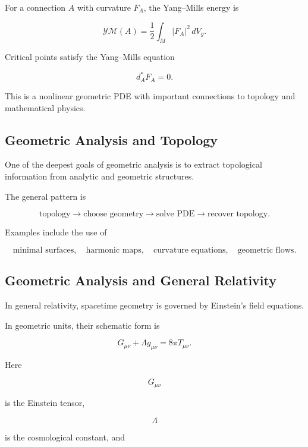 For a connection \(A\) with curvature \(F_A\), the Yang--Mills energy is

\[
\boxed{
\mathcal{YM}(A)
=
\frac12
\int_M
|F_A|^2
\,dV_g.
}
\]

Critical points satisfy the Yang--Mills equation

\[
\boxed{
d_A^\ast F_A=0.
}
\]

This is a nonlinear geometric PDE with important connections to topology
and mathematical physics.

\subsection{Geometric Analysis and Topology}
\label{subsec:geometric-analysis-topology}

One of the deepest goals of geometric analysis is to extract topological
information from analytic and geometric structures.

The general pattern is

\[
\boxed{
\text{topology}
\longrightarrow
\text{choose geometry}
\longrightarrow
\text{solve PDE}
\longrightarrow
\text{recover topology}.
}
\]

Examples include the use of

\[
\boxed{
\text{minimal surfaces},
\quad
\text{harmonic maps},
\quad
\text{curvature equations},
\quad
\text{geometric flows}.
}
\]

\subsection{Geometric Analysis and General Relativity}
\label{subsec:geometric-analysis-relativity}

In general relativity, spacetime geometry is governed by Einstein's field
equations.

In geometric units, their schematic form is

\[
\boxed{
G_{\mu\nu}
+
\Lambda g_{\mu\nu}
=
8\pi T_{\mu\nu}.
}
\]

Here

\[
G_{\mu\nu}
\]

is the Einstein tensor,

\[
\Lambda
\]

is the cosmological constant, and


